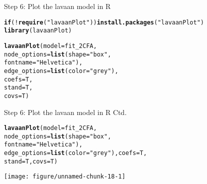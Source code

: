 \documentclass[10pt]{beamer}\usepackage[]{graphicx}\usepackage[]{xcolor}
\makeatletter
\def\maxwidth{ %
  \ifdim\Gin@nat@width>\linewidth
    \linewidth
  \else
    \Gin@nat@width
  \fi
}
\newcommand{\hlsng}[1]{\textcolor[rgb]{0.192,0.494,0.8}{#1}}%
\newcommand{\hlopt}[1]{\textcolor[rgb]{0,0,0}{#1}}%
\newcommand{\hldef}[1]{\textcolor[rgb]{0.345,0.345,0.345}{#1}}%
\newcommand{\hlkwa}[1]{\textcolor[rgb]{0.161,0.373,0.58}{\textbf{#1}}}%
\newcommand{\hlkwc}[1]{\textcolor[rgb]{0.333,0.667,0.333}{#1}}%
\newcommand{\hlkwd}[1]{\textcolor[rgb]{0.737,0.353,0.396}{\textbf{#1}}}%
\newenvironment{kframe}{%
 \def\at@end@of@kframe{}%
 \ifinner\ifhmode%
  \def\at@end@of@kframe{\end{minipage}}%
  \begin{minipage}{\columnwidth}%
 \fi\fi%
 \def\FrameCommand##1{\hskip\@totalleftmargin \hskip-\fboxsep
 \colorbox{shadecolor}{##1}\hskip-\fboxsep
     \hskip-\linewidth \hskip-\@totalleftmargin \hskip\columnwidth}%
 \MakeFramed {\advance\hsize-\width
   \@totalleftmargin\z@ \linewidth\hsize
   \@setminipage}}%
 {\par\unskip\endMakeFramed%
 \at@end@of@kframe}
\newenvironment{knitrout}{}{} %
\makeatother
\begin{document}
\begin{frame}[fragile]{Step 6: Plot the lavaan model in R}

\begin{knitrout}
\color{fgcolor}\begin{kframe}
\begin{alltt}
\hlkwa{if} \hldef{(}\hlopt{!}\hlkwd{require}\hldef{(}\hlsng{"lavaanPlot"}\hldef{))} \hlkwd{install.packages}\hldef{(}\hlsng{"lavaanPlot"}\hldef{)}
\hlkwd{library}\hldef{(lavaanPlot)}
\end{alltt}
\end{kframe}
\end{knitrout}
\begin{knitrout}
\color{fgcolor}\begin{kframe}
\begin{alltt}
\hlkwd{lavaanPlot}\hldef{(}\hlkwc{model} \hldef{= fit_2CFA,}
           \hlkwc{node_options} \hldef{=} \hlkwd{list}\hldef{(}\hlkwc{shape} \hldef{=} \hlsng{"box"}\hldef{,}
                               \hlkwc{fontname} \hldef{=} \hlsng{"Helvetica"}\hldef{),}
           \hlkwc{edge_options} \hldef{=} \hlkwd{list}\hldef{(}\hlkwc{color} \hldef{=} \hlsng{"grey"}\hldef{),}
           \hlkwc{coefs} \hldef{= T,}
           \hlkwc{stand} \hldef{= T,}
           \hlkwc{covs} \hldef{= T)}
\end{alltt}
\end{kframe}
\end{knitrout}
\end{frame}
%
\begin{frame}[fragile]{Step 6: Plot the lavaan model in R Ctd.}

\begin{knitrout}
\color{fgcolor}\begin{kframe}
\begin{alltt}
\hlkwd{lavaanPlot}\hldef{(}\hlkwc{model} \hldef{= fit_2CFA,}
           \hlkwc{node_options} \hldef{=} \hlkwd{list}\hldef{(}\hlkwc{shape} \hldef{=} \hlsng{"box"}\hldef{,}
                               \hlkwc{fontname} \hldef{=} \hlsng{"Helvetica"}\hldef{),}
           \hlkwc{edge_options} \hldef{=} \hlkwd{list}\hldef{(}\hlkwc{color} \hldef{=} \hlsng{"grey"}\hldef{),} \hlkwc{coefs} \hldef{= T,}
           \hlkwc{stand} \hldef{= T,} \hlkwc{covs} \hldef{= T)}
\end{alltt}
\end{kframe}
\texttt{[image: figure/unnamed-chunk-18-1]} 
\end{knitrout}
\end{frame}
\end{document}
